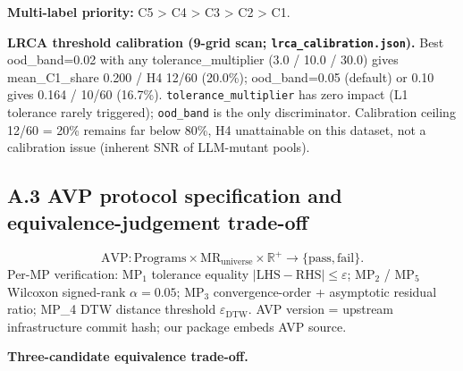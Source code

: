 \documentclass[acmsmall,screen,review]{acmart}
\begin{document}
\textbf{Multi-label priority:} C5 \textgreater{} C4 \textgreater{} C3
\textgreater{} C2 \textgreater{} C1.

\textbf{LRCA threshold calibration (9-grid scan;
\texttt{lrca\_calibration.json}).} Best ood\_band=0.02 with any
tolerance\_multiplier (3.0 / 10.0 / 30.0) gives mean\_C1\_share 0.200 /
H4 12/60 (20.0\%); ood\_band=0.05 (default) or 0.10 gives 0.164 / 10/60
(16.7\%). \texttt{tolerance\_multiplier} has zero impact (L1 tolerance
rarely triggered); \texttt{ood\_band} is the only discriminator.
Calibration ceiling 12/60 = 20\% remains far below 80\%, H4
unattainable on this dataset, not a calibration issue (inherent SNR of
LLM-mutant pools).

\subsection{A.3 AVP protocol specification and equivalence-judgement trade-off}\label{a.3-avp-protocol-specification-and-equivalence-judgement-trade-off}

\[
\mathrm{AVP}: \mathrm{Programs} \times \mathrm{MR}_{\mathrm{universe}} \times \mathbb{R}^{+} \to \{\mathrm{pass}, \mathrm{fail}\}.
\]
Per-MP verification: $\mathrm{MP}_1$ tolerance equality $|\mathrm{LHS} -
\mathrm{RHS}| \leq \varepsilon$; $\mathrm{MP}_2$ / $\mathrm{MP}_5$ Wilcoxon signed-rank $\alpha=0.05$; $\mathrm{MP}_3$
convergence-order + asymptotic residual ratio; MP\_4 DTW distance
threshold $\varepsilon_{\mathrm{DTW}}$. AVP version = upstream infrastructure commit hash; our package embeds
AVP source.

\textbf{Three-candidate equivalence trade-off.}
\end{document}
